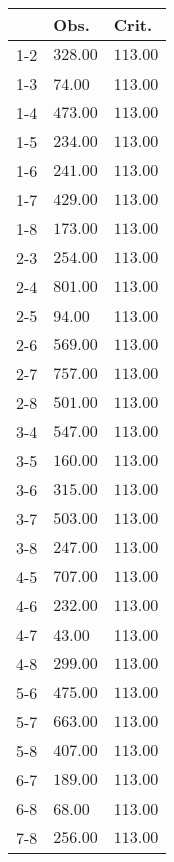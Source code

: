 \begin{table}[ht]
\centering
\begin{tabular}{rll}
  \hline
 & Obs. & Crit. \\ 
  \hline
1-2 & \(\mathbf{328.00}\) & \(\mathbf{113.00}\) \\ 
  1-3 & 74.00 & 113.00 \\ 
  1-4 & \(\mathbf{473.00}\) & \(\mathbf{113.00}\) \\ 
  1-5 & \(\mathbf{234.00}\) & \(\mathbf{113.00}\) \\ 
  1-6 & \(\mathbf{241.00}\) & \(\mathbf{113.00}\) \\ 
  1-7 & \(\mathbf{429.00}\) & \(\mathbf{113.00}\) \\ 
  1-8 & \(\mathbf{173.00}\) & \(\mathbf{113.00}\) \\ 
  2-3 & \(\mathbf{254.00}\) & \(\mathbf{113.00}\) \\ 
  2-4 & \(\mathbf{801.00}\) & \(\mathbf{113.00}\) \\ 
  2-5 & 94.00 & 113.00 \\ 
  2-6 & \(\mathbf{569.00}\) & \(\mathbf{113.00}\) \\ 
  2-7 & \(\mathbf{757.00}\) & \(\mathbf{113.00}\) \\ 
  2-8 & \(\mathbf{501.00}\) & \(\mathbf{113.00}\) \\ 
  3-4 & \(\mathbf{547.00}\) & \(\mathbf{113.00}\) \\ 
  3-5 & \(\mathbf{160.00}\) & \(\mathbf{113.00}\) \\ 
  3-6 & \(\mathbf{315.00}\) & \(\mathbf{113.00}\) \\ 
  3-7 & \(\mathbf{503.00}\) & \(\mathbf{113.00}\) \\ 
  3-8 & \(\mathbf{247.00}\) & \(\mathbf{113.00}\) \\ 
  4-5 & \(\mathbf{707.00}\) & \(\mathbf{113.00}\) \\ 
  4-6 & \(\mathbf{232.00}\) & \(\mathbf{113.00}\) \\ 
  4-7 & 43.00 & 113.00 \\ 
  4-8 & \(\mathbf{299.00}\) & \(\mathbf{113.00}\) \\ 
  5-6 & \(\mathbf{475.00}\) & \(\mathbf{113.00}\) \\ 
  5-7 & \(\mathbf{663.00}\) & \(\mathbf{113.00}\) \\ 
  5-8 & \(\mathbf{407.00}\) & \(\mathbf{113.00}\) \\ 
  6-7 & \(\mathbf{189.00}\) & \(\mathbf{113.00}\) \\ 
  6-8 & 68.00 & 113.00 \\ 
  7-8 & \(\mathbf{256.00}\) & \(\mathbf{113.00}\) \\ 
   \hline
\end{tabular}
\end{table}
